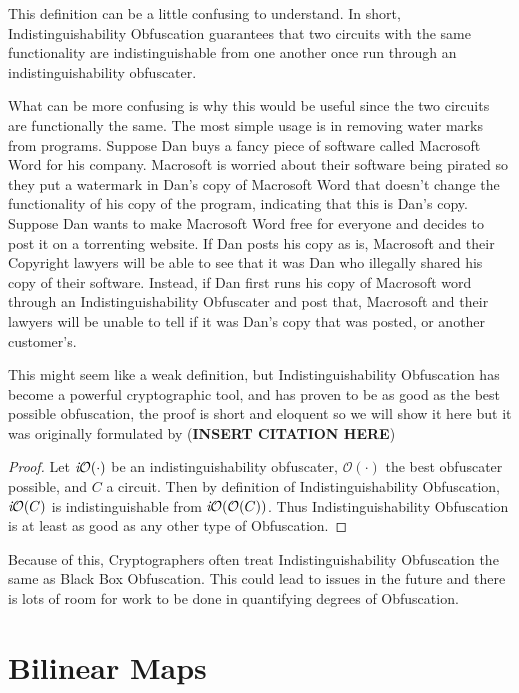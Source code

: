 \documentclass[12pt,twoside]{reedthesis}
\begin{document}
    \par This definition can be a little confusing to understand. In short, Indistinguishability Obfuscation guarantees that two circuits with the same functionality are indistinguishable from one another once run through an indistinguishability obfuscater. 
    \par What can be more confusing is why this would be useful since the two circuits are functionally the same. The most simple usage is in removing water marks from programs. Suppose Dan buys a fancy piece of software called Macrosoft Word for his company. Macrosoft is worried about their software being pirated so they put a watermark in Dan's copy of Macrosoft Word that doesn't change the functionality of his copy of the program, indicating that this is Dan's copy. Suppose Dan wants to make Macrosoft Word free for everyone and decides to post it on a torrenting website. If Dan posts his copy as is, Macrosoft and their Copyright lawyers will be able to see that it was Dan who illegally shared his copy of their software. Instead, if Dan first runs his copy of Macrosoft word through an Indistinguishability Obfuscater and post that, Macrosoft and their lawyers will be unable to tell if it was Dan's copy that was posted, or another customer's.
    \par This might seem like a weak definition, but Indistinguishability Obfuscation has become a powerful cryptographic tool, and has proven to be as good as the best possible obfuscation, the proof is short and eloquent so we will show it here but it was originally formulated by (\textbf{INSERT CITATION HERE})
    
    \newcommand{\Oh}[0]{\mathcal{O}}
    \begin{proof}
    Let $\textit{i}\mathcal{O}(\cdot)$ be an indistinguishability obfuscater, $\Oh(\cdot)$ the best obfuscater possible, and $C$ a circuit. Then by definition of Indistinguishability Obfuscation, $\textit{i}\mathcal{O}(C)$ is indistinguishable from $\iO(\Oh(C))$. Thus Indistinguishability Obfuscation is at least as good as any other type of Obfuscation.
    \end{proof}
    
    Because of this, Cryptographers often treat Indistinguishability Obfuscation the same as Black Box Obfuscation. This could lead to issues in the future and there is lots of room for work to be done in quantifying degrees of Obfuscation.
    
    
    \section{Bilinear Maps}
    
\end{document}
